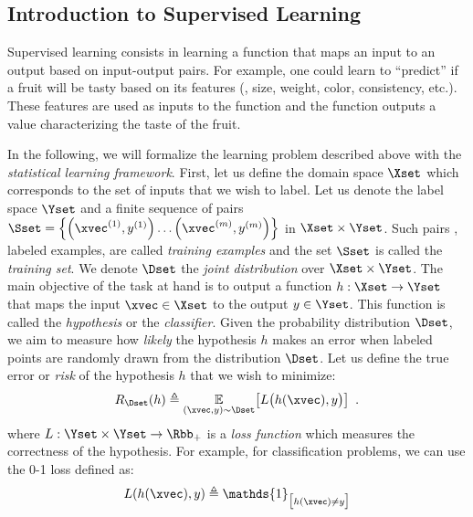 \subsection{Introduction to Supervised Learning}
\label{subsection:ch2-introduction_on_supervised_learning}

Supervised learning consists in learning a function that maps an input to an output based on input-output pairs.
For example, one could learn to ``predict'' if a fruit will be tasty based on its features (\eg, size, weight, color, consistency, etc.).
These features are used as inputs to the function and the function outputs a value characterizing the taste of the fruit.

In the following, we will formalize the learning problem described above with the \emph{statistical learning framework}.
First, let us define the domain space $\Xset$ which corresponds to the set of inputs that we wish to label.
Let us denote the label space $\Yset$ and a finite sequence of pairs $\Sset = \left\{ \left(\xvec^{(1)}, y^{(1)} \right) \dots \left( \xvec^{(m)}, y^{(m)} \right) \right\}$ in $\Xset \times \Yset$.
Such pairs \ie, labeled examples, are called \emph{training examples} and the set $\Sset$ is called the \emph{training set}.
We denote $\Dset$ the \emph{joint distribution} over $\Xset \times \Yset$.
The main objective of the task at hand is to output a function $h: \Xset \rightarrow \Yset$ that maps the input $\xvec \in \Xset$ to the output $y \in \Yset$.
This function is called the \emph{hypothesis} or the \emph{classifier}.
Given the probability distribution $\Dset$, we aim to measure how \emph{likely} the hypothesis $h$ makes an error when labeled points are randomly drawn from the distribution $\Dset$.
Let us define the true error or \emph{risk} of the hypothesis $h$ that we wish to minimize:
\begin{equation} \label{equation:ch2-risk}
  R_{\Dset}(h) \triangleq \Ebb_{(\xvec, y) \sim \Dset} \left[ L\big( h(\xvec), y \big) \right] \enspace.
\end{equation}
where $L: \Yset \times \Yset \rightarrow \Rbb_{+}$ is a \emph{loss function} which measures the correctness of the hypothesis.
For example, for classification problems, we can use the 0-1 loss defined as: %
\begin{equation}
  L(h(\xvec), y) \triangleq \mathds{1}_{\big[ h(\xvec) \neq y \big]}
\end{equation}

